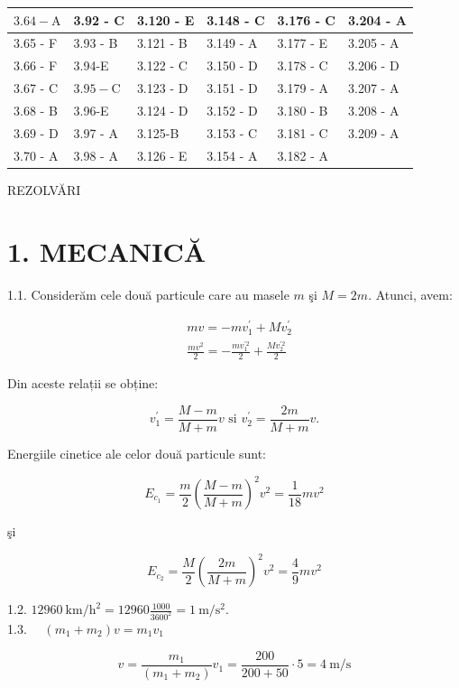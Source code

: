 \documentclass[10pt]{article}
\begin{document}
\begin{center}
\begin{tabular}{|l|l|l|l|l|l|}
\hline
$3.64-\mathrm{A}$ & 3.92 - C & 3.120 - E & 3.148 - C & 3.176 - C & 3.204 - A \\
\hline
3.65 - F & 3.93 - B & 3.121 - B & 3.149 - A & 3.177 - E & 3.205 - A \\
\hline
3.66 - F & 3.94-E & 3.122 - C & 3.150 - D & 3.178 - C & 3.206 - D \\
\hline
3.67 - C & $3.95-\mathrm{C}$ & 3.123 - D & 3.151 - D & 3.179 - A & 3.207 - A \\
\hline
3.68 - B & 3.96-E & 3.124 - D & 3.152 - D & 3.180 - B & 3.208 - A \\
\hline
3.69 - D & 3.97 - A & 3.125-B & 3.153 - C & 3.181 - C & 3.209 - A \\
\hline
3.70 - A & 3.98 - A & 3.126 - E & 3.154 - A & 3.182 - A &  \\
\hline
\end{tabular}
\end{center}

REZOLVĂRI

\section*{1. MECANICĂ}
1.1. Considerăm cele două particule care au masele $m$ şi $M=2 m$. Atunci, avem:

$$
\begin{aligned}
& m v=-m v_{1}^{\prime}+M v_{2}^{\prime} \\
& \frac{m v^{2}}{2}=-\frac{m v_{1}^{\prime 2}}{2}+\frac{M v_{2}^{\prime 2}}{2}
\end{aligned}
$$

Din aceste relații se obține:

$$
v_{1}^{\prime}=\frac{M-m}{M+m} v \text { si } v_{2}^{\prime}=\frac{2 m}{M+m} v .
$$

Energiile cinetice ale celor două particule sunt:

$$
E_{c_{1}}=\frac{m}{2}\left(\frac{M-m}{M+m}\right)^{2} v^{2}=\frac{1}{18} m v^{2}
$$

şi

$$
E_{c_{2}}=\frac{M}{2}\left(\frac{2 m}{M+m}\right)^{2} v^{2}=\frac{4}{9} m v^{2}
$$

1.2. $12960 \mathrm{~km} / \mathrm{h}^{2}=12960 \frac{1000}{3600^{2}}=1 \mathrm{~m} / \mathrm{s}^{2}$.\\
1.3. $\quad\left(m_{1}+m_{2}\right) v=m_{1} v_{1}$

$$
v=\frac{m_{1}}{\left(m_{1}+m_{2}\right)} v_{1}=\frac{200}{200+50} \cdot 5=4 \mathrm{~m} / \mathrm{s}
$$
\end{document}
